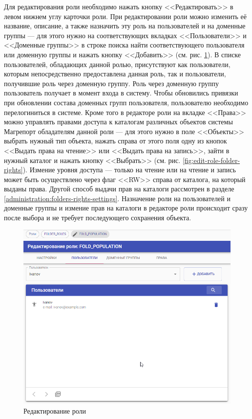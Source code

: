 \documentclass[../user-manual.tex]{subfiles}
\begin{document}
	Для редактирования роли необходимо нажать кнопку <<Редактировать>> в левом нижнем углу карточки роли. При редактировании роли можно изменить её название, описание, а также назначить эту роль на пользователей и на доменные группы --- для этого нужно на соответствующих вкладках <<Пользователи>> и <<Доменные группы>> в строке поиска найти соответствующего пользователя или доменную группы и нажать кнопку <<Добавить>> (см. рис. \ref{fig:edit-role}). В списке пользователей, обладающих данной ролью, присутствуют как пользователи, которым непосредственно предоставлена данная роль, так и пользователи, получившие роль через доменную группу. Роль через доменную группу пользователь получает в момент входа в систему. Чтобы обновились привязки при обновлении состава доменных групп пользователя, пользователю необходимо перелогиниться в системе. Кроме того в редакторе роли на вкладке <<Права>> можно управлять правами доступа к каталогам различных объектов системы Магрепорт обладателям данной роли --- для этого нужно в поле <<Объекты>> выбрать нужный тип объекта, нажать справа от этого поля одну из кнопок <<Выдать права на чтение>> или <<Выдать права на запись>>, зайти в нужный каталог и нажать кнопку <<Выбрать>> (см. рис. \ref{fig:edit-role-folder-rights}). Измение уровня доступа --- только на чтение или на чтение и запись может быть осуществлено через флаг <<RW>> справа от каталога, на который выданы права. Другой способ выдачи прав на каталоги рассмотрен в разделе \ref{administration:folders-rights-settings}. Назначение роли на пользователей и доменные группы и измение прав на каталоги в редакторе роли происходит сразу после выбора и не требует последующего сохранения объекта.
	
	\begin{figure}[h]
		\centering
		\includegraphics[width=\graphicswidth]{img/03-edit-role.png}
		\caption{Редактирование роли}
		\label{fig:edit-role}
	\end{figure}	
\end{document}
